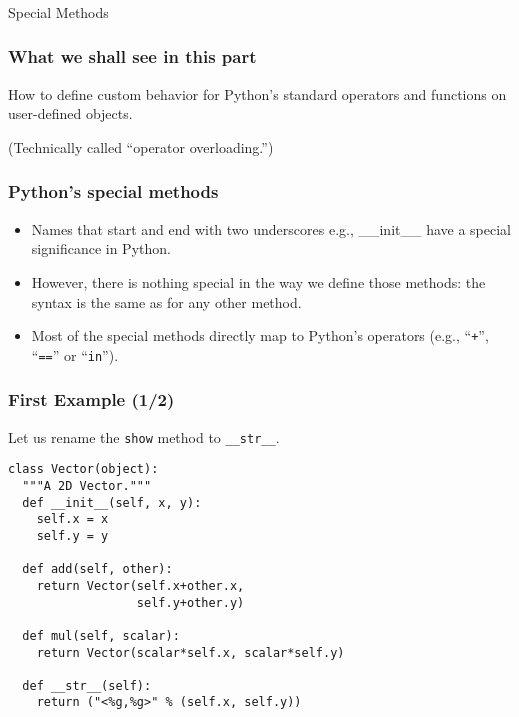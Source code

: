 \begin{frame}[fragile]\frametitle{}
\begin{center}
{\Large Special Methods}
\end{center}
\end{frame}

\begin{frame}[fragile]\frametitle{What we shall see in this part}

  How to define custom behavior for Python's standard operators and
  functions on user-defined objects.

  
  (Technically called ``operator overloading.'')
\end{frame}

\begin{frame}[fragile]\frametitle{Python's special methods}

\begin{itemize}
\item Names that start and end with two underscores e.g., \_\_init\_\_ have a special significance in Python.
\item However, there is nothing special in the way we define those
  methods: the syntax is the same as for any other method.
  \item    Most of the special methods directly map to Python's operators (e.g.,
  ``\texttt{+}'', ``\texttt{==}'' or ``\texttt{in}'').
\end{itemize}
\end{frame}

\begin{frame}[fragile]\frametitle{First Example (1/2)}
 Let us rename the \texttt{show} method to \texttt{\_\_str\_\_}.
\begin{lstlisting}
class Vector(object):
  """A 2D Vector."""
  def __init__(self, x, y):
    self.x = x
    self.y = y
    
  def add(self, other):
    return Vector(self.x+other.x,
                  self.y+other.y)
                  
  def mul(self, scalar):
    return Vector(scalar*self.x, scalar*self.y)
    
  def __str__(self):
    return ("<%g,%g>" % (self.x, self.y))
\end{lstlisting}
  
\end{frame}

